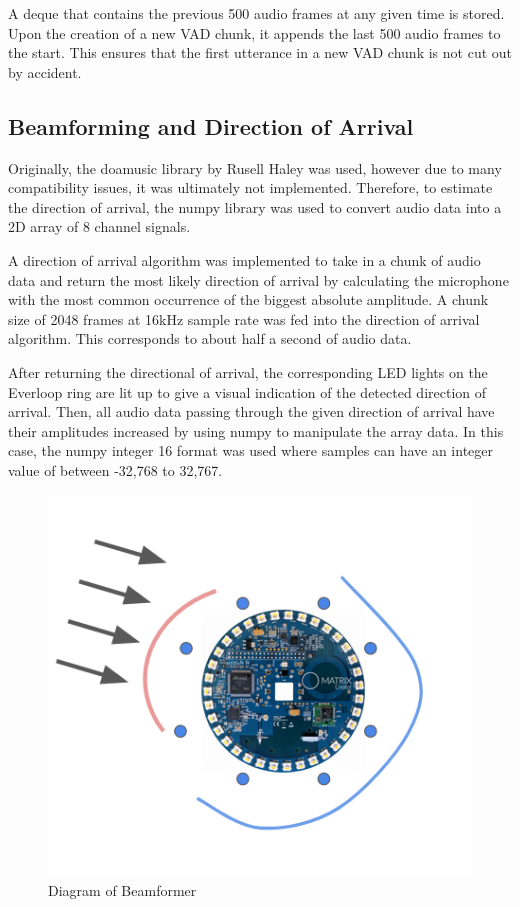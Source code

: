 \documentclass[hidelinks,12pt]{report} %
\begin{document}
A deque that contains the previous 500 audio frames at any given time is stored. Upon the creation of a new VAD chunk, it appends the last 500 audio frames to the start. This ensures that the first utterance in a new VAD chunk is not cut out by accident.

\subsection{Beamforming and Direction of Arrival}

Originally, the doamusic library by Rusell Haley\cite{45} was used, however due to many compatibility issues, it was ultimately not implemented. Therefore, to estimate the direction of arrival, the numpy library was used to convert audio data into a 2D array of 8 channel signals.

A direction of arrival algorithm was implemented to take in a chunk of audio data and return the most likely direction of arrival by calculating the microphone with the most common occurrence of the biggest absolute amplitude. A chunk size of 2048 frames at 16kHz sample rate was fed into the direction of arrival algorithm. This corresponds to about half a second of audio data. 

After returning the directional of arrival, the corresponding LED lights on the Everloop ring are lit up to give a visual indication of the detected direction of arrival. Then, all audio data passing through the given direction of arrival have their amplitudes increased by using numpy to manipulate the array data. In this case, the numpy integer 16 format was used where samples can have an integer value of between -32,768 to 32,767. 

\begin{figure}[h]
\centering
\includegraphics[scale = 1.0]{fig4.4} 
\caption{Diagram of Beamformer}
\label{fig}
\end{figure}
\end{document}

